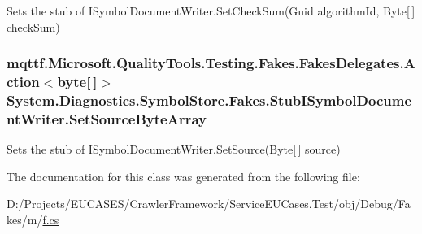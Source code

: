 Sets the stub of I\-Symbol\-Document\-Writer.\-Set\-Check\-Sum(\-Guid algorithm\-Id, Byte\mbox{[}$\,$\mbox{]} check\-Sum)

\hypertarget{class_system_1_1_diagnostics_1_1_symbol_store_1_1_fakes_1_1_stub_i_symbol_document_writer_a8ea940457edf3f9edfcb005d76548b19}{
\subsubsection[{Set\-Source\-Byte\-Array}]{\setlength{\rightskip}{0pt plus 5cm}mqttf.\-Microsoft.\-Quality\-Tools.\-Testing.\-Fakes.\-Fakes\-Delegates.\-Action$<$byte\mbox{[}$\,$\mbox{]}$>$ System.\-Diagnostics.\-Symbol\-Store.\-Fakes.\-Stub\-I\-Symbol\-Document\-Writer.\-Set\-Source\-Byte\-Array}}\label{class_system_1_1_diagnostics_1_1_symbol_store_1_1_fakes_1_1_stub_i_symbol_document_writer_a8ea940457edf3f9edfcb005d76548b19}


Sets the stub of I\-Symbol\-Document\-Writer.\-Set\-Source(\-Byte\mbox{[}$\,$\mbox{]} source)



The documentation for this class was generated from the following file\-:\begin{DoxyCompactItemize}
\item 
D\-:/\-Projects/\-E\-U\-C\-A\-S\-E\-S/\-Crawler\-Framework/\-Service\-E\-U\-Cases.\-Test/obj/\-Debug/\-Fakes/m/\hyperlink{m_2f_8cs}{f.\-cs}\end{DoxyCompactItemize}
